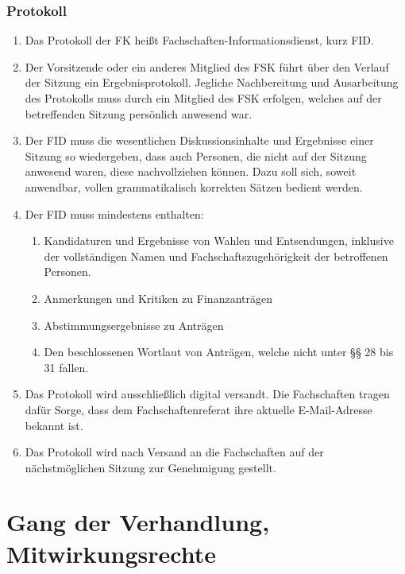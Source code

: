 \documentclass{article}
\begin{document}
\section{Protokoll}
\begin{enumerate}[(1)]
    \item Das Protokoll der FK heißt Fachschaften-Informationsdienst, kurz FID.
    \item Der Vorsitzende oder ein anderes Mitglied des FSK führt über den Verlauf der Sitzung ein Ergebnisprotokoll. 
    	Jegliche Nachbereitung und Ausarbeitung des Protokolls muss durch ein Mitglied des FSK erfolgen, welches auf der betreffenden Sitzung persönlich anwesend war.
    \item Der FID muss die wesentlichen Diskussionsinhalte und Ergebnisse einer Sitzung so wiedergeben, dass auch Personen, die nicht auf der Sitzung anwesend waren, diese nachvollziehen können. 
    	Dazu soll sich, soweit anwendbar, vollen grammatikalisch korrekten Sätzen bedient werden.
    \item Der FID muss mindestens enthalten:
    \begin{enumerate}[1.]
        \item Kandidaturen und Ergebnisse von Wahlen und Entsendungen, inklusive der vollständigen Namen und Fachschaftszugehörigkeit der betroffenen Personen.
        \item Anmerkungen und Kritiken zu Finanzanträgen
        \item Abstimmungsergebnisse zu Anträgen
        \item Den beschlossenen Wortlaut von Anträgen, welche nicht unter §§ 28 bis 31 fallen.
    \end{enumerate}
    \item Das Protokoll wird ausschließlich digital versandt.
    	Die Fachschaften tragen dafür Sorge, dass dem Fachschaftenreferat ihre aktuelle E-Mail-Adresse bekannt ist.
    \item Das Protokoll wird nach Versand an die Fachschaften auf der nächstmöglichen Sitzung zur Genehmigung gestellt.
\end{enumerate}

\part{Gang der Verhandlung, Mitwirkungsrechte}
\end{document}
